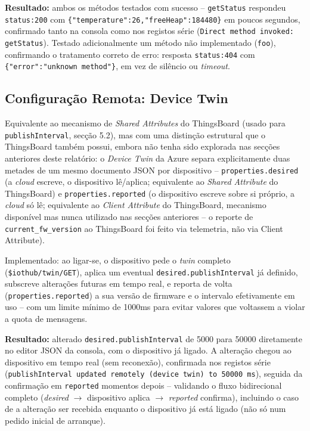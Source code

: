 \documentclass[a4paper,12pt]{article}
\begin{document}
\textbf{Resultado:} ambos os métodos testados com sucesso -- \texttt{getStatus} respondeu \texttt{status:200} com \texttt{\{"temperature":26,"freeHeap":184480\}} em poucos segundos, confirmado tanto na consola como nos registos série (\texttt{Direct method invoked: getStatus}). Testado adicionalmente um método não implementado (\texttt{foo}), confirmando o tratamento correto de erro: resposta \texttt{status:404} com \texttt{\{"error":"unknown method"\}}, em vez de silêncio ou \textit{timeout}.

\subsection{Configuração Remota: Device Twin}
Equivalente ao mecanismo de \textit{Shared Attributes} do ThingsBoard (usado para \texttt{publishInterval}, secção 5.2), mas com uma distinção estrutural que o ThingsBoard também possui, embora não tenha sido explorada nas secções anteriores deste relatório: o \textit{Device Twin} da Azure separa explicitamente duas metades de um mesmo documento JSON por dispositivo -- \texttt{properties.desired} (a \textit{cloud} escreve, o dispositivo lê/aplica; equivalente ao \textit{Shared Attribute} do ThingsBoard) e \texttt{properties.reported} (o dispositivo escreve sobre si próprio, a \textit{cloud} só lê; equivalente ao \textit{Client Attribute} do ThingsBoard, mecanismo disponível mas nunca utilizado nas secções anteriores -- o reporte de \texttt{current\_fw\_version} ao ThingsBoard foi feito via telemetria, não via Client Attribute).

Implementado: ao ligar-se, o dispositivo pede o \textit{twin} completo (\texttt{\$iothub/twin/GET}), aplica um eventual \texttt{desired.publishInterval} já definido, subscreve alterações futuras em tempo real, e reporta de volta (\texttt{properties.reported}) a sua versão de firmware e o intervalo efetivamente em uso -- com um limite mínimo de 1000ms para evitar valores que voltassem a violar a quota de mensagens.

\textbf{Resultado:} alterado \texttt{desired.publishInterval} de 5000 para 50000 diretamente no editor JSON da consola, com o dispositivo já ligado. A alteração chegou ao dispositivo em tempo real (sem reconexão), confirmada nos registos série (\texttt{publishInterval updated remotely (device twin) to 50000 ms}), seguida da confirmação em \texttt{reported} momentos depois -- validando o fluxo bidirecional completo (\textit{desired} $\rightarrow$ dispositivo aplica $\rightarrow$ \textit{reported} confirma), incluindo o caso de a alteração ser recebida enquanto o dispositivo já está ligado (não só num pedido inicial de arranque).
\end{document}
